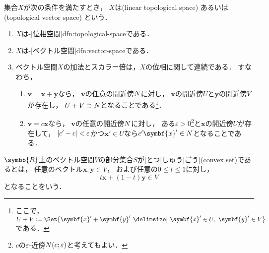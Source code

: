 \documentclass[../sotsu.tex]{subfiles}
\begin{document}
\begin{definition}[位相ベクトル空間]
    集合$X$が次の条件を満たすとき，
    $X$は(linear topological space)%
    あるいは(topological vector space)%
    という\cite{kolmogorov-1979}．
    \begin{enumerate}
        \item $X$は-[位相空間]{dfn:topological-space}である．
        \item $X$は-[ベクトル空間]{dfn:vector-space}である．
        \item ベクトル空間$X$の加法とスカラー倍は，$X$の位相に関して連続である．
            すなわち，
        \begin{enumerate}
            \item {}\quad $\symbf{v} = \symbf{x} + \symbf{y}$なら，
                $\symbf{v}$の任意の開近傍$N$に対し，
                $\symbf{x}$の開近傍$U$と$\symbf{y}$の開近傍$V$が存在し，
                $U + V \supset N$となることである\footnote{
                    ここで，$U + V \coloneq \Set{ \symbf{x}' + \symbf{y}'  \given  \symbf{x}' \in U, \  \symbf{y}' \in V }$である．
                }．
            \item {}\quad $\symbf{v} = c \symbf{x}$なら，
                $\symbf{v}$の任意の開近傍$N$に対し，
                ある$\varepsilon > 0$\footnote{
                    $c$の$\varepsilon$-近傍$N(c; \varepsilon)$と考えてもよい．
                }と$\symbf{x}$の開近傍$U$が存在して，
                $\lvert c' - c\rvert < \varepsilon$かつ$\symbf{x}' \in U$なら$c' \symbf{x}' \in \neigh$となることである．
        \end{enumerate}
    \end{enumerate}
\end{definition}


\begin{definition}[凸集合]
    \label{dfn:convex-set}
    $\symbb{R}$上のベクトル空間$V$の部分集合$S$が[とつ|しゅう|ごう](convex set)であるとは，
    任意のベクトル$\symbf{x}, \symbf{y} \in V$，
    および任意の$0 \leq t \leq 1$に対し，
    \begin{equation*}
        t \symbf{x} + (1 - t) \symbf{y} \in V
    \end{equation*}
    となることをいう．
\end{definition}
\end{document}
